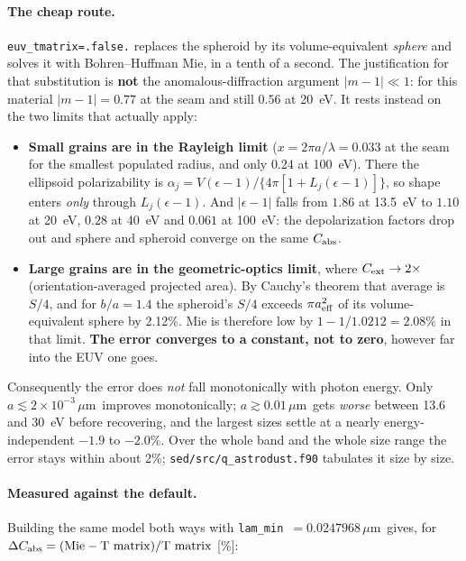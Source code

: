 \documentclass{my_memo}
\newcommand{\code}[1]{\texttt{#1}}
\newcommand{\um}{\ensuremath{\,\mu\mathrm{m}}}
\begin{document}
\paragraph{The cheap route.} \code{euv\_tmatrix=.false.} replaces the spheroid
by its volume-equivalent \emph{sphere} and solves it with Bohren--Huffman Mie,
in a tenth of a second. The justification for that substitution is \textbf{not}
the anomalous-diffraction argument $|m-1|\ll1$: for this material $|m-1| = 0.77$
at the seam and still $0.56$ at \SI{20}{\electronvolt}. It rests instead on the
two limits that actually apply:

\begin{itemize}
\item \textbf{Small grains are in the Rayleigh limit} ($x = 2\pi a/\lambda =
      0.033$ at the seam for the smallest populated radius, and only $0.24$ at
      \SI{100}{\electronvolt}). There the ellipsoid polarizability is
      $\alpha_j = V(\epsilon-1)/\{4\pi[1 + L_j(\epsilon-1)]\}$, so shape enters
      \emph{only} through $L_j(\epsilon-1)$. And $|\epsilon-1|$ falls from
      $1.86$ at \SI{13.5}{\electronvolt} to $1.10$ at \SI{20}{\electronvolt},
      $0.28$ at \SI{40}{\electronvolt} and $0.061$ at
      \SI{100}{\electronvolt}: the depolarization factors drop out and sphere
      and spheroid converge on the same $C_{\rm abs}$.
\item \textbf{Large grains are in the geometric-optics limit}, where $C_{\rm
      ext}\to2\times$(orientation-averaged projected area). By Cauchy's theorem
      that average is $S/4$, and for $b/a = 1.4$ the spheroid's $S/4$ exceeds
      $\pi a_{\rm eff}^2$ of its volume-equivalent sphere by 2.12\%. Mie is
      therefore low by $1 - 1/1.0212 = 2.08\%$ in that limit. \textbf{The error
      converges to a constant, not to zero}, however far into the EUV one goes.
\end{itemize}

\noindent Consequently the error does \emph{not} fall monotonically with photon
energy. Only $a\lesssim2\times10^{-3}$\um\ improves monotonically; $a\gtrsim
0.01$\um\ gets \emph{worse} between 13.6 and \SI{30}{\electronvolt} before
recovering, and the largest sizes settle at a nearly energy-independent
$-1.9$ to $-2.0\%$. Over the whole band and the whole size range the error stays
within about 2\%; \code{sed/src/q\_astrodust.f90} tabulates it size by size.

\paragraph{Measured against the default.} Building the same model both ways with
\code{lam\_min}~$=0.0247968$\um\ gives, for $\Delta C_{\rm abs} = ({\rm Mie} -
{\rm T\ matrix})/{\rm T\ matrix}$ [\%]:
\end{document}
